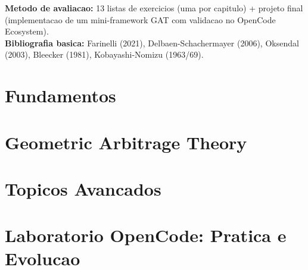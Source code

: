 \documentclass[12pt,a4paper,oneside,openany]{book}
\theoremstyle{remark}
\newcommand{\1}{\mathbf{1}}
\begin{document}
\begin{center}
{\begin{minipage}{0.92\textwidth}
\textbf{Metodo de avaliacao:} 13 listas de exercicios (uma por capitulo) +
projeto final (implementacao de um mini-framework GAT com validacao no
OpenCode Ecosystem).\\[6pt]

\textbf{Bibliografia basica:}
Farinelli (2021), Delbaen-Schachermayer (2006), Oksendal (2003),
Bleecker (1981), Kobayashi-Nomizu (1963/69).
\end{minipage}}
\end{center}

\tableofcontents

\part{Fundamentos}






\part{Geometric Arbitrage Theory}







\part{Topicos Avancados}






\part{Laboratorio OpenCode: Pratica e Evolucao}




\appendix





\end{document}
